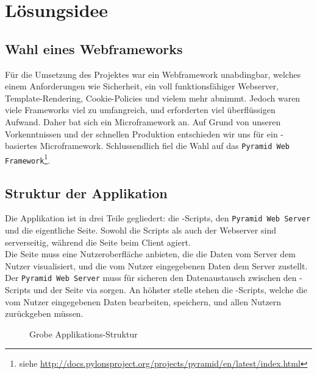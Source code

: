 \chapter{Lösungsidee}
\section{Wahl eines Webframeworks}
Für die Umsetzung des Projektes war ein Webframework unabdingbar, welches einem Anforderungen wie Sicherheit,  %
ein voll funktionsfähiger Webserver, Template-Rendering, Cookie-Policies und vielem mehr abnimmt. Jedoch waren %
viele Frameworks viel zu umfangreich, und erforderten viel überflüssigen Aufwand. Daher bat sich ein Microframework
an. Auf Grund von unseren Vorkenntnissen und der schnellen Produktion entschieden wir uns für ein \Python-basiertes
Microframework.
Schlussendlich fiel die Wahl auf das \texttt{Pyramid Web Framework}\footnote{siehe \url{http://docs.pylonsproject.org/projects/pyramid/en/latest/index.html}}.

\section{Struktur der Applikation}
Die Applikation ist in drei Teile gegliedert: die \Python-Scripts, den \texttt{Pyramid Web Server} und die eigentliche Seite.
Sowohl die Scripts als auch der Webserver sind serverseitig, während die Seite beim Client agiert.\\
Die Seite muss eine Nutzeroberfläche anbieten, die die Daten vom Server dem Nutzer visualisiert, und die vom
Nutzer eingegebenen Daten dem Server zustellt. Der \texttt{Pyramid Web Server} muss für sicheren den Datenaustausch zwischen den 
\Python-Scripts und der Seite via sorgen. An höhster stelle stehen die \Python-Scripts, welche die vom Nutzer eingegebenen Daten
bearbeiten, speichern, und allen Nutzern zurückgeben müssen.

\vspace{2em}

\begin{figure}[H]
	\centering
	\caption{Grobe Applikations-Struktur}
\end{figure}

